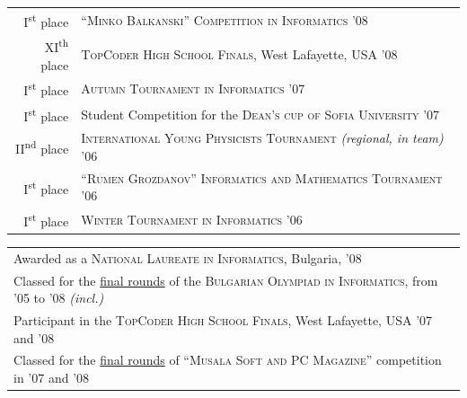 \documentclass[a4paper,10pt]{article}
\def\myline{\color{linegray}\vline}
\begin{document}
{\vspace{-3mm}\hspace{3.5mm}\begin{tabular}{r!{\myline}p{14cm}}
	I\textsuperscript{st} place    &  \textsc{``Minko Balkanski''} \textsc{Competition in Informatics} \textsc{'08}\\
	XI\textsuperscript{th} place   &  \textsc{TopCoder High School Finals}, West Lafayette, USA \textsc{'08}\\
	I\textsuperscript{st} place    &  \textsc{Autumn Tournament in Informatics} \textsc{'07}\\
	I\textsuperscript{st} place    &  Student Competition for the \textsc{Dean's cup of Sofia University} \textsc{'07}\\
	II\textsuperscript{nd} place   &  \textsc{International Young Physicists Tournament} {\small\textit{(regional, in team)}} \textsc{'06}\\
	I\textsuperscript{st} place    &  \textsc{``Rumen Grozdanov''} \textsc{Informatics and Mathematics Tournament} \textsc{'06}\\
	I\textsuperscript{st} place    &  \textsc{Winter Tournament in Informatics} \textsc{'06}\\
\end{tabular}
\medskip

\hspace{3mm}\begin{tabular}{@{•\enskip}p{14.5cm}}
	Awarded as a \textsc{National Laureate in Informatics}, Bulgaria, \textsc{'08}\\
	Classed for the \underline{final rounds} of the \textsc{Bulgarian Olympiad in Informatics}, from \textsc{'05} to \textsc{'08} \small\textit{(incl.)}\\
	Participant in the \textsc{TopCoder High School Finals}, West Lafayette, USA \textsc{'07} and \textsc{'08}\\
	Classed for the \underline{final rounds} of \textsc{``Musala Soft and PC Magazine''} competition in \textsc{'07} and \textsc{'08}\\
\end{tabular}


}
\end{document}
